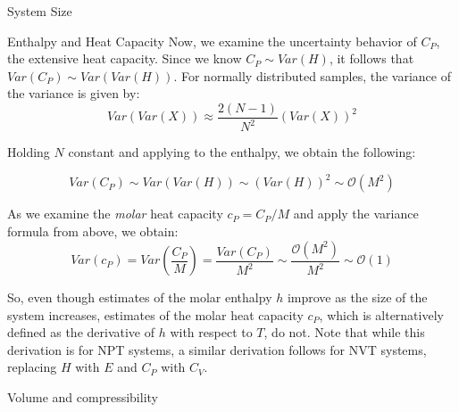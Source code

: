 \documentclass[aps,pre,twocolumn,nofootinbib,superscriptaddress,linenumbers,10pt, draft,tightenlines]{revtex4-1}
\begin{document}
\begin{subsection}{System Size}
\begin{subsubsection}{Enthalpy and Heat Capacity}
Now, we examine the uncertainty behavior of $C_P$, the extensive heat capacity.  Since we know $C_P \sim Var(H)$, it follows that $ Var(C_P) \sim Var(Var(H)) $.  For normally distributed samples, the variance of the variance is given by:
\begin{equation}
Var(Var(X)) \approx \frac{2(N-1)}{N^2} (Var(X))^2
\end{equation}

Holding $N$ constant and applying to the enthalpy, we obtain the following:

\begin{equation}
Var(C_P) \sim Var(Var(H)) \sim (Var(H))^2 \sim \mathcal{O}(M^2)
\end{equation}

As we examine the \emph{molar} heat capacity $c_P=C_P/M$ and apply the variance formula from above, we obtain:
\begin{equation}
Var(c_P) = Var(\frac{C_P}{M}) = \frac{Var(C_P)}{M^2}  \sim \frac{\mathcal{O}(M^2)}{M^2} \sim \mathcal{O}(1)
\end{equation}

So, even though estimates of the molar enthalpy $h$ improve as the size of the system increases, estimates of the molar heat capacity $c_P$, which is alternatively defined as the derivative of $h$ with respect to $T$, do not.  Note that while this derivation is for NPT systems, a similar derivation follows for NVT systems, replacing $H$ with $E$ and $C_P$ with $C_V$.
\end{subsubsection}

\begin{subsubsection}{Volume and compressibility}


\end{subsubsection}
\end{subsection}
\end{document}
